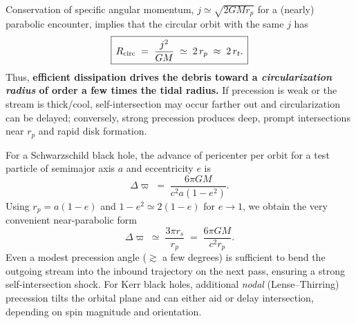 Conservation of specific angular momentum, $j \simeq \sqrt{2GM r_p}$ for a (nearly) parabolic encounter, implies that the circular orbit with the same $j$ has
\begin{equation}
\label{eq:R_circ}
\boxed{\,R_{\rm circ} \;=\; \frac{j^2}{GM} \;\simeq\; 2\,r_p \;\approx\; 2\,r_t.\,}
\end{equation}
Thus, \textbf{efficient dissipation drives the debris toward a \emph{circularization radius} of order a few times the tidal radius.} If precession is weak or the stream is thick/cool, self-intersection may occur farther out and circularization can be delayed; conversely, strong precession produces deep, prompt intersections near $r_p$ and rapid disk formation.
\par
For a Schwarzschild black hole, the advance of pericenter per orbit for a test particle of semimajor axis $a$ and eccentricity $e$ is
\begin{equation}
\Delta\varpi \;=\; \frac{6\pi GM}{c^2 a(1-e^2)}.
\end{equation}
Using $r_p = a(1-e)$ and $1-e^2 \simeq 2(1-e)$ for $e\to 1$, we obtain the very convenient near-parabolic form
\begin{equation}
\label{eq:precession_rp}
\boxed{\,\Delta\varpi \;\simeq\; \frac{3\pi r_s}{r_p} \;=\; \frac{6\pi GM}{c^2 r_p}.\,}
\end{equation}
Even a modest precession angle ($\gtrsim$ a few degrees) is sufficient to bend the outgoing stream into the inbound trajectory on the next pass, ensuring a strong self-intersection shock. For Kerr black holes, additional \emph{nodal} (Lense–Thirring) precession tilts the orbital plane and can either aid or delay intersection, depending on spin magnitude and orientation.

